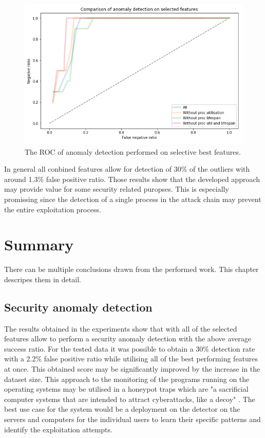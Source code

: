 \documentclass[a4paper,twoside,12pt]{book}
\begin{document}
\begin{figure}
	\centering
	\includegraphics[scale=0.9]{images/CombinedFinalROCDroping}
	\caption{The ROC of anomaly detection performed on selective best features.}
	\label{fig:combinedCompFinalROCDroping}
 \end{figure}

In general all conbined features allow for detection of 30\% of the outliers with around 1.3\% false positive ratio. 
Those results show that the developed approach may provide value for some security related puropses. This is especially
promissing since the detection of a single process in the attack chain may prevent the entire exploitation process.



\chapter{Summary}

There can be multiple conclusions drawn from the performed work. This chapter descripes them in 
detail.

\section{Security anomaly detection}

The results obtained in the experiments show that with all of the selected features allow 
to perform a security anomaly detection with the above average success ratio. For the tested
data it was possible to obtain a 30\% detection rate with a 2.2\% false positive ratio while
utilising all of the best performing features at once. This obtained score may be significantly 
improved by the increase in the dataset size. This approach to the monitoring of the programs 
running on the operating systems may be utilised in a honeypot traps which are "a sacrificial 
computer systems that are intended to attract cyberattacks, like a decoy" \cite{bib:Honeypot}. 
The best use case for the system would be a deployment on the detector on the servers and 
computers for the individual users to learn their specific patterns and identify the exploitation
attempts.
\end{document}
